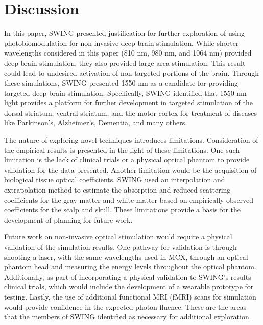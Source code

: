 \documentclass[journal,twoside,web]{ieeecolor}
\begin{document}
\section{Discussion}
\label{sec:next steps}
In this paper, SWING presented justification for further exploration of using photobiomodulation for non-invasive deep brain stimulation. While 
shorter wavelengths considered in this paper (810 nm, 980 nm, and 1064 nm) provided deep brain stimulation, they also provided large area stimulation. 
This result could lead to undesired activation of non-targeted portions of the brain. Through these simulations, SWING presented 1550 nm as a candidate for 
providing targeted deep brain stimulation. Specifically, SWING identified that 1550 nm light provides a platform for further development in targeted 
stimulation of the dorsal striatum, ventral striatum, and the motor cortex for treatment of diseases like Parkinson's, Alzheimer's, Dementia, and many others.

The nature of exploring novel techniques introduces limitations. Consideration of the empirical results is presented in the light of these limitations. One such
limitation is the lack of clinical trials or a physical optical phantom to provide validation for the data presented. Another limitation would be the acquisition
of biological tissue optical coefficients. SWING used an interpolation and extrapolation method to estimate the absorption and reduced scattering coefficients for
the gray matter and white matter based on empirically observed coefficients\cite{b5} for the scalp and skull. These limitations provide a basis for the
development of planning for future work. 

Future work on non-invasive optical stimulation would require a physical validation of the simulation results. 
One pathway for validation is through shooting a laser, with the same wavelengths used in MCX, through an optical phantom head and 
measuring the energy levels throughout the optical phantom. Additionally, as part of incorporating a physical validation to SWING's results
clinical trials, which would include the development of a wearable prototype for testing. Lastly, the use of additional functional MRI (fMRI) scans
for simulation would provide confidence in the expected photon fluence. These are the areas that the members of SWING identified as necessary for 
additional exploration.
\end{document}
